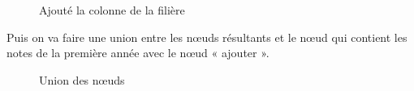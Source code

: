 \documentclass{article}
\begin{document}
            \begin{figure}[h!]
                \centering
                \caption{Ajouté la colonne de la filière}
                \label{fig:8}
            \end{figure}
            \newpage Puis on va faire une union entre les nœuds résultants et le nœud qui contient les notes de la première année avec le nœud « ajouter ».\par
            \begin{figure}[h!]
                \centering
                \caption{Union des nœuds}
                \label{fig:9}
            \end{figure}
\end{document}
